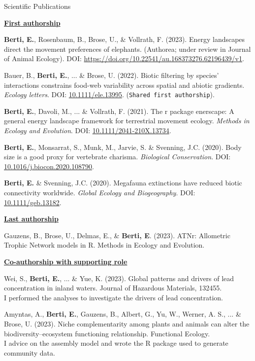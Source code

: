 \documentclass{resume} %
\begin{document}
\begin{rSection}{Scientific Publications}

{\large\textbf{\underline{First authorship}}}

\textbf{Berti, E.}, Rosenbaum, B., Brose, U., \& Vollrath, F. (2023). Energy landscapes direct the movement preferences of elephants. (Authorea; under review in Journal of Animal Ecology). DOI: \url{https://doi.org/10.22541/au.168373276.62196439/v1}.

Bauer, B., \textbf{Berti, E.}, ... \& Brose, U. (2022). Biotic filtering by species’ interactions constrains food-web variability across spatial and abiotic gradients. \textit{Ecology letters}. DOI: \href{https://doi.org/10.1111/ele.13995}{10.1111/ele.13995}. (\texttt{Shared first authorship}).

\textbf{Berti, E.}, Davoli, M., ... \& Vollrath, F. (2021). The r package enerscape: A general energy landscape framework for terrestrial movement ecology. \textit{Methods in Ecology and Evolution}. DOI: \href{https://doi.org/10.1111/2041-210X.13734}{10.1111/2041-210X.13734}.

\textbf{Berti, E.}, Monsarrat, S., Munk, M., Jarvie, S. \& Svenning, J.C. (2020). Body size is a good proxy for vertebrate charisma. \textit{Biological Conservation}. DOI: \href{https://doi.org/10.1016/j.biocon.2020.108790}{10.1016/j.biocon.2020.108790}.

\textbf{Berti, E.} \& Svenning, J.C. (2020). Megafauna extinctions have reduced biotic connectivity worldwide. \textit{Global Ecology and Biogeography}. DOI: \href{https://doi.org/10.1111/geb.13182}{10.1111/geb.13182}.

{\large\textbf{\underline{Last authorship}}}

Gauzens, B., Brose, U., Delmas, E., \& \textbf{Berti, E}. (2023). ATNr: Allometric Trophic Network models in R. Methods in Ecology and Evolution.

{\large\textbf{\underline{Co-authorship with supporting role}}}

Wei, S., \textbf{Berti, E.}, ... \& Yue, K. (2023). Global patterns and drivers of lead concentration in inland waters. Journal of Hazardous Materials, 132455.\\
I performed the analyses to investigate the drivers of lead concentration.

Amyntas, A., \textbf{Berti, E.}, Gauzens, B., Albert, G., Yu, W., Werner, A. S., ... \& Brose, U. (2023). Niche complementarity among plants and animals can alter the biodiversity–ecosystem functioning relationship. Functional Ecology.\\
I advice on the assembly model and wrote the R package used to generate community data.


\end{rSection}
\end{document}
